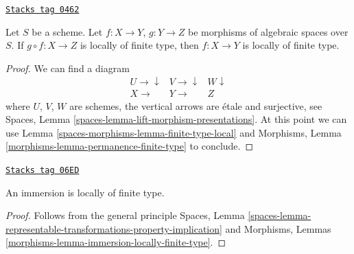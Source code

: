\begin{lemma}
\label{spaces-morphisms-lemma-permanence-finite-type}
\href{https://stacks.math.columbia.edu/tag/0462}{\texttt{Stacks tag 0462}}

Let $S$ be a scheme.
Let $f : X \to Y$, $g : Y \to Z$ be morphisms of algebraic spaces over $S$.
If $g \circ f : X \to Z$ is locally of finite type, then $f : X \to Y$
is locally of finite type.
\end{lemma}

\begin{proof}
We can find a diagram
$$
\begin{array}{ccc}U \longrightarrow\downarrow & V \longrightarrow\downarrow & W \downarrow \\ X \longrightarrow & Y \longrightarrow & Z\end{array}
$$
where $U$, $V$, $W$ are schemes, the vertical arrows are \'etale and surjective,
see
Spaces, Lemma \ref{spaces-lemma-lift-morphism-presentations}.
At this point we can use
Lemma \ref{spaces-morphisms-lemma-finite-type-local}
and
Morphisms, Lemma \ref{morphisms-lemma-permanence-finite-type}
to conclude.
\end{proof}

\begin{lemma}
\label{spaces-morphisms-lemma-immersion-locally-finite-type}
\href{https://stacks.math.columbia.edu/tag/06ED}{\texttt{Stacks tag 06ED}}

An immersion is locally of finite type.
\end{lemma}

\begin{proof}
Follows from the general principle
Spaces, Lemma
\ref{spaces-lemma-representable-transformations-property-implication}
and
Morphisms, Lemmas \ref{morphisms-lemma-immersion-locally-finite-type}.
\end{proof}

